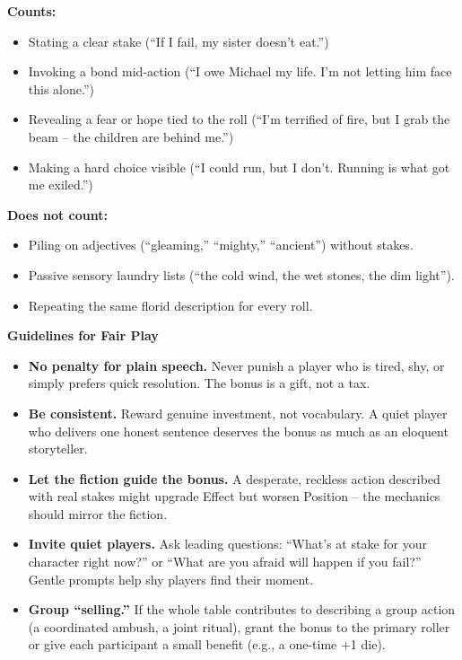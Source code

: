 \begin{tcolorbox}
\textbf{Counts:}
\begin{itemize}
  \item Stating a clear stake (``If I fail, my sister doesn't eat.'')
  \item Invoking a bond mid-action (``I owe Michael my life. I'm not letting him face this alone.'')
  \item Revealing a fear or hope tied to the roll (``I'm terrified of fire, but I grab the beam -- the children are behind me.'')
  \item Making a hard choice visible (``I could run, but I don't. Running is what got me exiled.'')
\end{itemize}

\textbf{Does not count:}
\begin{itemize}
  \item Piling on adjectives (``gleaming,'' ``mighty,'' ``ancient'') without stakes.
  \item Passive sensory laundry lists (``the cold wind, the wet stones, the dim light'').
  \item Repeating the same florid description for every roll.
\end{itemize}

\medskip
\noindent\textbf{Guidelines for Fair Play}
\begin{itemize}
  \item \textbf{No penalty for plain speech.} Never punish a player who is tired,
        shy, or simply prefers quick resolution. The bonus is a gift, not a tax.
  \item \textbf{Be consistent.} Reward genuine investment, not vocabulary. A
        quiet player who delivers one honest sentence deserves the bonus as much
        as an eloquent storyteller.
  \item \textbf{Let the fiction guide the bonus.} A desperate, reckless action
        described with real stakes might upgrade Effect but worsen Position --
        the mechanics should mirror the fiction.
  \item \textbf{Invite quiet players.} Ask leading questions: ``What's at stake
        for your character right now?'' or ``What are you afraid will happen if
        you fail?'' Gentle prompts help shy players find their moment.
  \item \textbf{Group ``selling.''} If the whole table contributes to describing a
        group action (a coordinated ambush, a joint ritual), grant the bonus to
        the primary roller or give each participant a small benefit (e.g., a
        one-time +1 die).
\end{itemize}


\end{tcolorbox}

